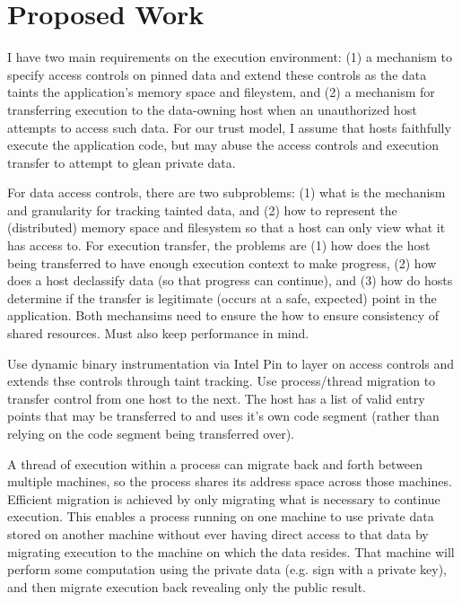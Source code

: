 \section{Proposed Work}
\label{sec:propose}


I have two main requirements on the execution environment: (1) a mechanism to
specify access controls on pinned data and extend these controls as the data
taints the application's memory space and fileystem, and (2) a mechanism for
transferring execution to the data-owning host when an unauthorized host
attempts to access such data.  
%
For our trust model, I assume that hosts faithfully execute the application
code, but may abuse the access controls and execution transfer to attempt to
glean private data.


For data access controls, there are two subproblems: (1) what is the
mechanism and granularity for tracking tainted data, and (2) how to represent the
(distributed) memory space and filesystem so that a host can only view what
it has access to.  
%
For execution transfer, the problems are (1) how does the host being
transferred to have enough execution context to make progress, (2) how does a
host declassify data (so that progress can continue), and (3) how do hosts 
determine if the transfer is legitimate (occurs at a safe, expected) point in
the application.  
%
Both mechansims need to ensure the how to ensure consistency of shared
resources.
%
Must also keep performance in mind.

Use dynamic binary instrumentation via Intel Pin to layer on access controls
and extends thse controls through taint tracking.  Use process/thread migration
to transfer control from one host to the next.  The host has a list of valid
entry points that may be transferred to and uses it's own code segment (rather
than relying on the code segment being transferred over).

A thread of execution within a process can migrate back and forth between
multiple machines, so the process shares its address space across those
machines.  Efficient migration is achieved by only migrating what is necessary
to continue execution.  This enables a process running on one machine to use
private data stored on another machine without ever having direct access to
that data by migrating execution to the machine on which the data resides.  That
machine will perform some computation using the private data (e.g. sign with a
private key), and then migrate execution back revealing only the public
result.

